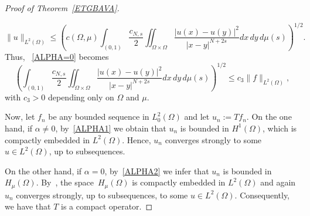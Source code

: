 \documentclass[12pt,a4paper,intlimits,sumlimits]{amsart}
\theoremstyle{definition}
\theoremstyle{plain}
\numberwithin{equation}{section}
\renewcommand{\le}{\leqslant}
\begin{document}
\begin{proof}[Proof of Theorem~\ref{ETGBAVA}]
\begin{itemize}
\[
\|u\|_{L^2(\Omega)} \le \left(c(\Omega, \mu)\int_{(0, 1)} \frac{c_{N, s}}{2} \iint_{\Omega\times\Omega} \frac{|u(x)-u(y)|^2}{|x-y|^{N+2s}} dx\,dy\, d\mu(s)\right)^{1/2}.
\]
Thus, ~\eqref{ALPHA=0} becomes
\begin{equation}\label{ALPHA2}
\left(\int_{(0, 1)} \frac{c_{N, s}}{2} \iint_{\Omega\times\Omega} \frac{|u(x)-u(y)|^2}{|x-y|^{N+2s}} dx\,dy\, d\mu(s)\right)^{1/2} \le c_3 \|f\|_{L^2(\Omega)},
\end{equation}
with $c_3>0$ depending only on $\Omega$ and $\mu$.
\end{itemize}
Now, let $f_n$ be any bounded sequence in $L_0^2(\Omega)$ and let $u_n:= T f_n$. On the one hand, if $\alpha\neq 0$, by~\eqref{ALPHA1} we obtain that $u_n$ is bounded in $H^1(\Omega)$, which is compactly embedded in $L^2(\Omega)$.  Hence, $u_n$ converges strongly to some $u\in L^2(\Omega)$, up to subsequences. 

On the other hand, if $\alpha = 0$, by~\eqref{ALPHA2} we infer that $u_n$ is bounded in~$H_\mu(\Omega)$. By~\cite[Corollary 7.2]{MR2944369}, the space~$H_\mu(\Omega)$ is compactly embedded in $L^2(\Omega)$ and again $u_n$ converges strongly, up to subsequences, to some $u\in L^2(\Omega)$. Consequently, we have that $T$ is a compact operator.


\end{proof}
\end{document}
